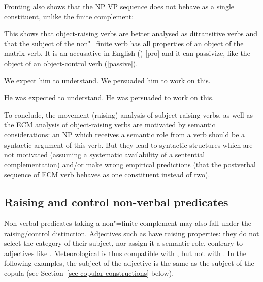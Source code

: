 \documentclass[output=paper
	        ,collection
	        ,collectionchapter
 	        ,biblatex
                ,babelshorthands
                ,newtxmath
                ,draftmode
                ,colorlinks, citecolor=brown
]{langscibook}
\begin{document}
\eal
{}
\zl

Fronting also shows that the NP VP sequence does not behave as a single constituent, unlike the finite complement:

\eal
{}
\zl


This shows that object-raising verbs are better analysed as ditransitive verbs and that the subject of the non"=finite verb has all properties of an object of the matrix verb. It is an accusative in English () \ref{pro} and it can passivize, like the object of an object-control verb (\ref{passive}).

\begin{exe}
\ex
\begin{xlist} \label{pro}
\ex We expect him to understand.
\ex  We persuaded him to work on this.
\end{xlist}
\ex \begin{xlist} \label{passive}
\ex  He was expected to understand.
\ex  He was persuaded to work on this.
\end{xlist}
	
\end{exe}


To conclude, the movement (raising) analysis of subject-raising verbs, as well as the ECM analysis of object-raising verbs are motivated by semantic considerations: an NP which receives a semantic role from a verb should be a syntactic argument of this verb. But they lead to syntactic structures which are not motivated (assuming a systematic availability of a sentential complementation) and/or make wrong empirical predictions (that the postverbal sequence of ECM verb behaves as one constituent instead of two).
 
\subsection{Raising and control non-verbal predicates}\label{nonverbal}

Non-verbal predicates taking a non"=finite complement may also fall under the raising/control distinction.  Adjectives such as  have raising properties: they do not select the category of their subject, nor assign it a semantic role, contrary to adjectives like . Meteorological  is thus compatible with , but not with . In the following examples, the subject of the adjective is the same as the subject of the copula (see Section~\ref{sec-copular-constructions} below).
\end{document}
